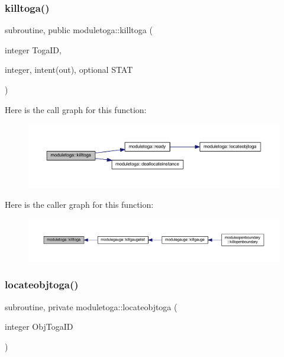 \subsubsection{\texorpdfstring{killtoga()}{killtoga()}}
{\footnotesize\ttfamily subroutine, public moduletoga\+::killtoga (\begin{DoxyParamCaption}\item[{integer}]{Toga\+ID,  }\item[{integer, intent(out), optional}]{S\+T\+AT }\end{DoxyParamCaption})}

Here is the call graph for this function\+:\nopagebreak
\begin{figure}[H]
\begin{center}
\leavevmode
\includegraphics[width=350pt]{namespacemoduletoga_a9aa03039890445420290aa3feba13a89_cgraph}
\end{center}
\end{figure}
Here is the caller graph for this function\+:\nopagebreak
\begin{figure}[H]
\begin{center}
\leavevmode
\includegraphics[width=350pt]{namespacemoduletoga_a9aa03039890445420290aa3feba13a89_icgraph}
\end{center}
\end{figure}
\mbox{\label{namespacemoduletoga_a0dcf3a4301085371bb48ab041d1cec59}} 
\subsubsection{\texorpdfstring{locateobjtoga()}{locateobjtoga()}}
{\footnotesize\ttfamily subroutine, private moduletoga\+::locateobjtoga (\begin{DoxyParamCaption}\item[{integer}]{Obj\+Toga\+ID }\end{DoxyParamCaption})\hspace{0.3cm}{\ttfamily [private]}}

